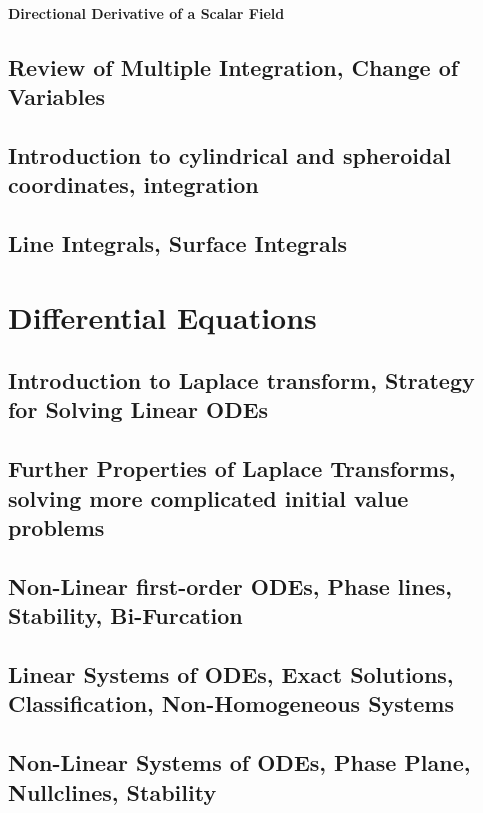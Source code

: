 \documentclass{book}
\begin{document}
                \subsubsection*{Directional Derivative of a Scalar Field}
        \section{Review of Multiple Integration, Change of Variables}
        \section{Introduction to cylindrical and spheroidal coordinates, integration}
        \section{Line Integrals, Surface Integrals}
    \chapter{Differential Equations}
        \section{Introduction to Laplace transform, Strategy for Solving Linear ODEs}
        \section{Further Properties of Laplace Transforms, solving more complicated initial value problems}
        \section{Non-Linear first-order ODEs, Phase lines, Stability, Bi-Furcation}
        \section{Linear Systems of ODEs, Exact Solutions, Classification, Non-Homogeneous Systems}
        \section{Non-Linear Systems of ODEs, Phase Plane, Nullclines, Stability}
\end{document}
